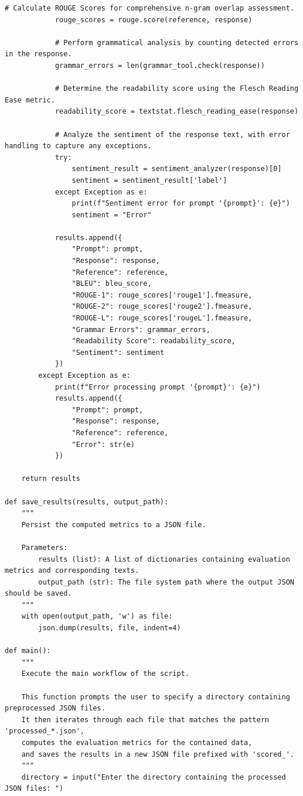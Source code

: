 \begin{lstlisting}[style=Python, caption={Python-data-preperation-for-analysis}, captionpos=b]
            # Calculate ROUGE Scores for comprehensive n-gram overlap assessment.
            rouge_scores = rouge.score(reference, response)

            # Perform grammatical analysis by counting detected errors in the response.
            grammar_errors = len(grammar_tool.check(response))

            # Determine the readability score using the Flesch Reading Ease metric.
            readability_score = textstat.flesch_reading_ease(response)

            # Analyze the sentiment of the response text, with error handling to capture any exceptions.
            try:
                sentiment_result = sentiment_analyzer(response)[0]
                sentiment = sentiment_result['label']
            except Exception as e:
                print(f"Sentiment error for prompt '{prompt}': {e}")
                sentiment = "Error"

            results.append({
                "Prompt": prompt,
                "Response": response,
                "Reference": reference,
                "BLEU": bleu_score,
                "ROUGE-1": rouge_scores['rouge1'].fmeasure,
                "ROUGE-2": rouge_scores['rouge2'].fmeasure,
                "ROUGE-L": rouge_scores['rougeL'].fmeasure,
                "Grammar Errors": grammar_errors,
                "Readability Score": readability_score,
                "Sentiment": sentiment
            })
        except Exception as e:
            print(f"Error processing prompt '{prompt}': {e}")
            results.append({
                "Prompt": prompt,
                "Response": response,
                "Reference": reference,
                "Error": str(e)
            })

    return results

def save_results(results, output_path):
    """
    Persist the computed metrics to a JSON file.

    Parameters:
        results (list): A list of dictionaries containing evaluation metrics and corresponding texts.
        output_path (str): The file system path where the output JSON should be saved.
    """
    with open(output_path, 'w') as file:
        json.dump(results, file, indent=4)

def main():
    """
    Execute the main workflow of the script.

    This function prompts the user to specify a directory containing preprocessed JSON files.
    It then iterates through each file that matches the pattern 'processed_*.json',
    computes the evaluation metrics for the contained data,
    and saves the results in a new JSON file prefixed with 'scored_'.
    """
    directory = input("Enter the directory containing the processed JSON files: ")


\end{lstlisting}
